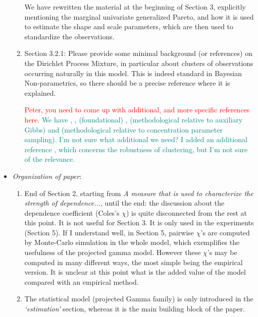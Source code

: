 \documentclass[10pt]{article}
\newcommand{\comment}[1]{\textcolor{teal}{#1}}
\newcommand{\bruno}[1]{\textcolor{red}{#1}}
\begin{document}
\begin{itemize}
\begin{enumerate}
        We have rewritten the material at the beginning of Section 3, explicitly mentioning the marginal
        univariate generalized Pareto, and how it is used to estimate the shape and scale parameters, 
        which are then used to standardize the observations.

    \item Section 3.2.1: Please provide some minimal background (or references) on the Dirichlet 
        Process Mixture, in particular about clusters of observations occurring naturally in this 
        model. This is indeed standard in Bayesian Non-parametrics, so there should be a precise 
        reference where it is explained.

        \bruno{Peter, you need to come up with additional, and more specific references here.}
        \comment{We have \cite{Ferguson74}, \cite{Antoniak1974}, (foundational) \cite{neal2000}, (methodological relative to auxiliary Gibbs) and \cite{escobar1995} (methodological relative to concentration parameter sampling).  I'm not sure what additional we need?  I added an additional reference \citep{ascolani2022}, which concerns the robustness of clustering, but I'm not sure of the relevance.}
        
\end{enumerate}

\item \emph{Organization of paper}:
    \begin{enumerate}
        \item End of Section 2, starting from \emph{A measure that is used to characterize 
            the strength of dependence...}, until the end: the discussion about the dependence 
            coefficient (Coles’s $\chi$) is quite disconnected from the rest at this point. It
            is not useful for Section 3. It is only used in the experiments (Section 5). If I 
            understand well, in Section 5, pairwise $\chi$’s are computed by Monte-Carlo simulation 
            in the whole model, which exemplifies the usefulness of the projected gamma model. 
            However these $\chi$’s may be computed in many different ways, the most simple being 
            the empirical version. It is unclear at this point what is the added value of the 
            model compared with an empirical method.

        \item The statistical model (projected Gamma family) is only introduced in the
            \emph{‘estimation’} section, whereas it is the main building block of the paper.


\end{enumerate}
\end{itemize}
\end{document}
